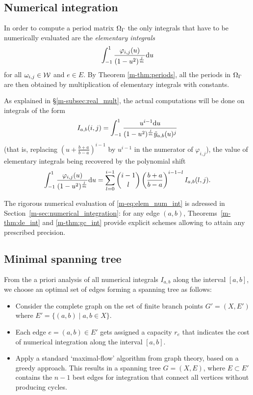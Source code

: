 \documentclass[main.tex]{subfiles}
\begin{document}
   \subsection{Numerical integration}\label{subsec:numerical_integration}

   In order to compute a period matrix $\Omega_{\Gamma}$ the only integrals that have to
   be numerically evaluated are
   the \emph{elementary integrals}
   \begin{equation}\label{eq:elem_ints}
       \int_{-1}^1 \frac{\varphi_{i,j}(u)}{(1-u^2)^{\frac{j}{m}}} \mathrm d u
   \end{equation}
   for all $\omega_{i,j} \in \mathcal{W}$ and $e \in E$. By Theorem \ref{m-thm:periods}, all the periods in $\Omega_{\Gamma}$ are
   then obtained by multiplication of elementary integrals with constants.

 As explained in \S \ref{m-subsec:real_mult}, the actual computations will be done on integrals of the form
\begin{equation}
    \label{eq:elem_num_int}
    I_{a,b}(i,j) = \int_{-1}^1\frac{u^{i-1}\mathrm d u}{(1-u^2)^{\frac jm}\tilde{y}_{a,b}(u)^j}
\end{equation}
(that is, replacing $(u+\frac{b+a}{b-a})^{i-1}$ by $u^{i-1}$ in the numerator of $\varphi_{i,j}$),
the value of elementary integrals being recovered by the polynomial shift
\begin{equation}
    \label{eq:polshift}
    \int_{-1}^1\frac{\varphi_{i,j}(u)}{(1-u^2)^{\frac jm}}\mathrm d u
    = \sum_{l=0}^{i-1} {i-1 \choose l} \left(\frac{b+a}{b-a}\right)^{i-1-l} I_{a,b}(l,j).
\end{equation}

The rigorous numerical evaluation of \eqref{m-eq:elem_num_int} is
adressed in Section~\ref{m-sec:numerical_integration}: for any edge $(a,b)$,
Theorems~\ref{m-thm:de_int} and \ref{m-thm:gc_int} provide
explicit schemes allowing to attain any prescribed precision.

  \subsection{Minimal spanning tree}\label{subsec:spanning_tree}


  From the a priori analysis of all numerical integrals $I_{a,b}$ along
  the interval $[a,b]$, we choose an optimal set of edges forming a spanning tree as follows:
  \begin{itemize}
      \item
   Consider the complete graph on the set of finite branch points $G' = (X,E')$ where
   $E' = \{  (a,b)  \mid  a,b \in X \}$.
      \item
   Each edge $e = (a,b) \in E'$ gets assigned a capacity $r_e$ that indicates
   the cost of numerical integration along the interval $[a,b]$.
   \item
   Apply a standard `maximal-flow' algorithm from graph theory, based on a greedy approach.
   This results in a spanning tree $G = (X,E)$, where $E \subset E'$ contains the $n-1$ best edges
   for integration that connect all vertices without producing cycles.
  \end{itemize}
\end{document}
